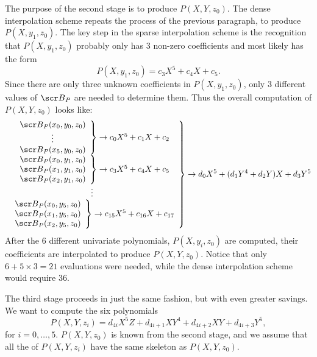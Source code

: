 The purpose of the second stage is to produce $P(X, Y, z_0)$.  The
dense interpolation scheme repeats the process of the previous
paragraph, to produce $P(X, y_1, z_0)$.  The key step in the sparse
interpolation scheme is the recognition that $P(X,y_1, z_0)$ probably
only has $3$ non-zero coefficients and most likely has the form
\[
P(X, y_1, z_0) = c_3 X^5 + c_4 X + c_5.
\]
Since there are only three unknown coefficients in $P(X, y_1, z_0)$,
only $3$ different values of ${\scr B}_P$ are needed to determine
them.  Thus the overall computation of $P(X, Y, z_0)$ looks like:
\[
\hspace*{-1pt}\left.\begin{array}{c}
\left.\begin{array}{c}
{\scr B}_P(x_0, y_0, z_0) \\ \vdots \\ {\scr B}_P(x_5, y_0, z_0)
\end{array}\right\} \rightarrow c_0X^5 + c_1 X + c_2 \\
\left.\begin{array}{c}
{\scr B}_P(x_0, y_1, z_0) \\ {\scr B}_P(x_1, y_1, z_0) \\ 
{\scr B}_P(x_2, y_1, z_0)
\end{array}\right\} \rightarrow c_3X^5 + c_4 X + c_5 \\
\vdots \\
\left.\begin{array}{c}
{\scr B}_P(x_0, y_5, z_0) \\ {\scr B}_P(x_1, y_5, z_0) \\ 
{\scr B}_P(x_2, y_5, z_0)
\end{array}\right\} \rightarrow c_{15}X^5 + c_{16} X + c_{17} 
\end{array}\right\} \rightarrow d_0 X^5 + (d_1 Y^4 + d_2 Y) X + d_3 Y^5
\]
After the $6$ different univariate polynomials, $P(X, y_i, z_0)$ are
computed, their coefficients are interpolated to produce $P(X, Y,
z_0)$.  Notice that only $6 + 5 \times 3 = 21$ evaluations were
needed, while the dense interpolation scheme would require $36$.

The third stage proceeds in just the same fashion, but with even
greater savings.  We want to compute the six polynomials
\[
P(X, Y, z_i) = d_{4i} X^5 Z + d_{4i+1} X Y^4 + d_{4i+2} X Y + d_{4i+3} Y^5,
\]
for $i = 0, \ldots, 5$.  $P(X, Y, z_0)$ is known from the second
stage, and we assume that all the of $P(X, Y, z_i)$ have the same skeleton
as $P(X, Y, z_0)$.

